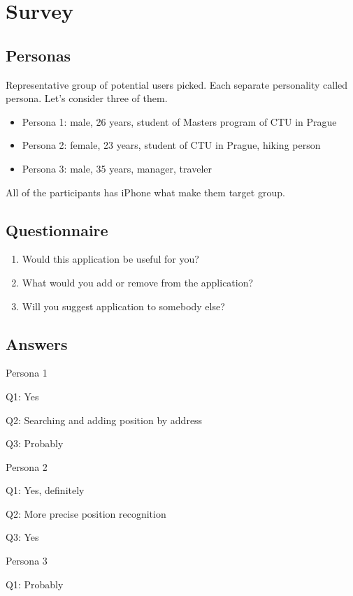 \documentclass[thesis=M,english]{FITthesis}[2012/10/20]
\begin{document}
\section{Survey}

\subsection{Personas}

Representative group of potential users picked. Each separate personality called persona. Let's consider three of them.

\begin{itemize}
	\item Persona 1: male, 26 years, student of Masters program of CTU in Prague
	\item Persona 2: female, 23 years, student of CTU in Prague, hiking person
	\item Persona 3: male, 35 years, manager, traveler
\end{itemize}
All of the participants has iPhone what make them target group.

\subsection{Questionnaire}

\begin{enumerate}
	\item Would this application be useful for you?
	\item What would you add or remove from the application?
	\item Will you suggest application to somebody else?
\end{enumerate}


\subsection{Answers}

Persona 1

Q1: Yes

Q2: Searching and adding position by address

Q3: Probably

Persona 2

Q1: Yes, definitely

Q2: More precise position recognition

Q3: Yes

Persona 3

Q1: Probably
\end{document}
